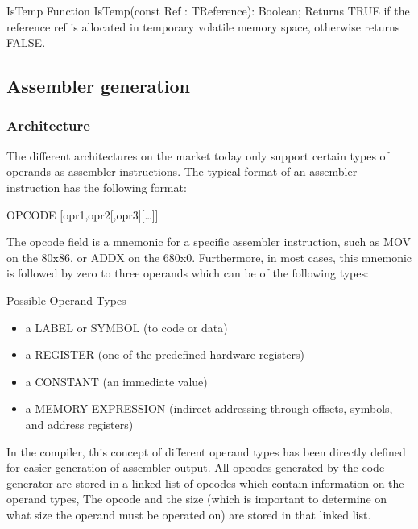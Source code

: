 \documentclass [a4paper,12pt]{article}
\begin{document}
\begin{function}{IsTemp}
\Declaration
Function IsTemp(const Ref : TReference): Boolean;
\Description
Returns TRUE if the reference \textsf{ref }is allocated in temporary
volatile memory space, otherwise returns FALSE.
\end{function}

\subsection{Assembler generation}
\label{subsec:mylabel8}

\subsubsection{Architecture}
\label{subsubsec:architectureneration}

The different architectures on the market today only support certain types
of operands as assembler instructions. The typical format of an assembler
instruction has the following format:

\begin{center}
\textsf{OPCODE [opr1,opr2[,opr3][\ldots ]]}
\end{center}

The opcode field is a mnemonic for a specific assembler instruction, such as
\textsf{MOV} on the 80x86, or \textsf{ADDX} on the 680x0. Furthermore, in
most cases, this mnemonic is followed by zero to three operands which can be
of the following types:

Possible Operand Types
\begin{itemize}
\item a LABEL or SYMBOL (to code or data)
\item a REGISTER (one of the predefined hardware registers) 
\item a CONSTANT (an immediate value)
\item a MEMORY EXPRESSION (indirect addressing through offsets, symbols, and
     address registers)
\end{itemize}

In the compiler, this concept of different operand types has been directly
defined for easier generation of assembler output. All opcodes generated by
the code generator are stored in a linked list of opcodes which contain
information on the operand types, The opcode and the size (which is
important to determine on what size the operand must be operated on) are
stored in that linked list.
\end{document}
